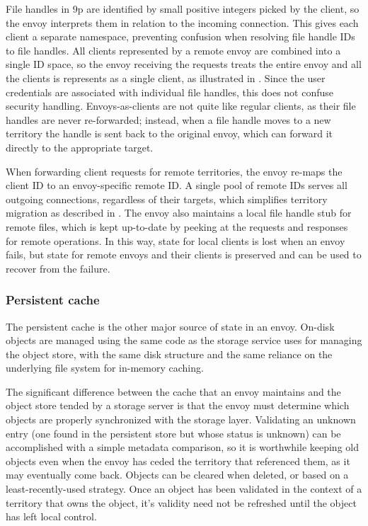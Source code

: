 File handles in 9p are identified by small positive integers picked by the client, so the envoy interprets them in relation to the incoming connection. This gives each client a separate namespace, preventing confusion when resolving file handle IDs to file handles. All clients represented by a remote envoy are combined into a single ID space, so the envoy receiving the requests treats the entire envoy and all the clients is represents as a single client, as illustrated in . Since the user credentials are associated with individual file handles, this does not confuse security handling. Envoys-as-clients are not quite like regular clients, as their file handles are never re-forwarded; instead, when a file handle moves to a new territory the handle is sent back to the original envoy, which can forward it directly to the appropriate target.

When forwarding client requests for remote territories, the envoy re-maps the client ID to an envoy-specific remote ID. A single pool of remote IDs serves all outgoing connections, regardless of their targets, which simplifies territory migration as described in . The envoy also maintains a local file handle stub for remote files, which is kept up-to-date by peeking at the requests and responses for remote operations. In this way, state for local clients is lost when an envoy fails, but state for remote envoys and their clients is preserved and can be used to recover from the failure.

\subsubsection{Persistent cache}

The persistent cache is the other major source of state in an envoy. On-disk objects are managed using the same code as the storage service uses for managing the object store, with the same disk structure and the same reliance on the underlying file system for in-memory caching.

The significant difference between the cache that an envoy maintains and the object store tended by a storage server is that the envoy must determine which objects are properly synchronized with the storage layer. Validating an unknown entry (one found in the persistent store but whose status is unknown) can be accomplished with a simple metadata comparison, so it is worthwhile keeping old objects even when the envoy has ceded the territory that referenced them, as it may eventually come back. Objects can be cleared when deleted, or based on a least-recently-used strategy. Once an object has been validated in the context of a territory that owns the object, it's validity need not be refreshed until the object has left local control.

